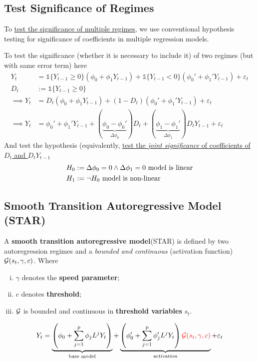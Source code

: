 \documentclass[11pt]{article}
\begin{document}
		\subsection{Test Significance of Regimes}
			\begin{remark}
				To \ul{test the significance of multiple regimes}, we use conventional hypothesis testing for significance of coefficients in multiple regression models.
			\end{remark}
			\begin{example}
				To test the significance (whether it is necessary to include it) of two regimes (but with same error term) here 
				\begin{align}
					Y_t &= \mathds{1}\{ Y_{t-1} \geq 0\} 
					\left ( 
						\phi_0 + \phi_1 Y_{t-1}
					\right )
					+ 
					\mathds{1}\{ Y_{t-1} < 0\} 
					\left ( 
						\phi_0' + \phi_1' Y_{t-1}
					\right ) + \varepsilon_t \\
					D_t &:= \mathds{1}\{ Y_{t-1} \geq 0\} \\
					\implies Y_t &= D_t \left (\phi_0 + \phi_1 Y_{t-1}\right ) + (1 - D_t) \left (\phi_0' + \phi_1' Y_{t-1}\right ) + \varepsilon_t \\
					\implies Y_t &= \phi_0' + \phi_1' Y_{t-1} + (\underbrace{\phi_0 - \phi_0'}_{\Delta \phi_0}) D_t + (\underbrace{\phi_1 - \phi_1'}_{\Delta \phi_1}) D_t Y_{t-1} + \varepsilon_t
				\end{align}
				And test the hypothesis (equivalently, \ul{test the \emph{joint significance} of coefficients of $D_t$ and $D_t Y_{t-1}$}
				\begin{align}
					H_0 &:= \Delta \phi_0 = 0 \land \Delta \phi_1 = 0 \text{{ model is linear}}\\
					H_1 &:= \neg H_0 \text{{ model is non-linear}}
				\end{align}
			\end{example}
			
		\subsection{Smooth Transition Autoregressive Model (STAR)}
			\begin{definition}
				A \textbf{smooth transition autoregressive model}(STAR) is defined by two autoregression regimes and a \emph{bounded and continuous} (activation function) $\mathcal{{G}}(s_t, \gamma, c)$. Where 
				\begin{enumerate}[(i)]
					\item $\gamma$ denotes the \textbf{speed parameter};
					\item $c$ denotes \textbf{threshold};
					\item $\mathcal{{G}}$ is bounded and continuous in \textbf{threshold variables} $s_t$.
				\end{enumerate}
				\begin{gather}
					Y_t = \underbrace{\left(
						\phi_0 + \sum_{j=1}^p \phi_j L^j Y_t
					\right)}_{\text{base model}} + 
					\underbrace{\left(
						\phi_0' + \sum_{j=1}^p \phi_j' L^j Y_t
						\right)
						\textcolor{red}{\mathcal{{G}}(s_t, \gamma, c)}
					}_{\text{activation}}
					+ \varepsilon_t
				\end{gather}
			\end{definition}
			
\end{document}

